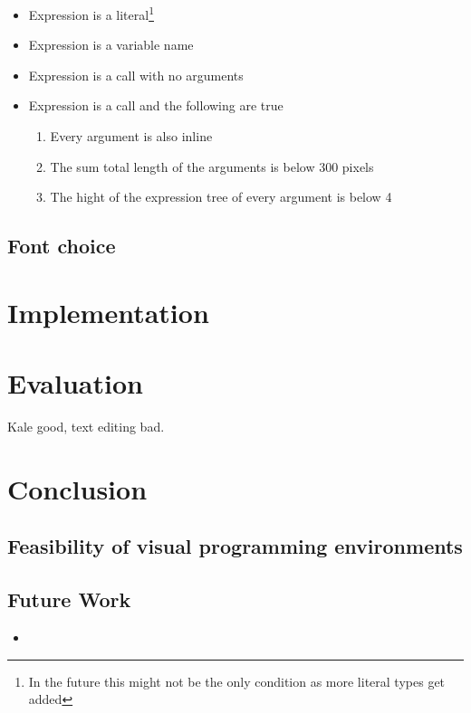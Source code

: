 \documentclass[11pt]{report}
\begin{document}
\begin{itemize}[noitemsep]
	\item Expression is a literal\footnote{In the future this might not be the
only condition as more literal types get added}
	\item Expression is a variable name
	\item Expression is a call with no arguments
	\item Expression is a call and the following are true
	\begin{enumerate}[noitemsep]
		\item Every argument is also inline
		\item The sum total length of the arguments is below 300 pixels
		\item The hight of the expression tree of every argument is below 4
	\end{enumerate}
\end{itemize}

\section{Font choice}

\chapter{Implementation}

\chapter{Evaluation}

Kale good, text editing bad.

\chapter{Conclusion}

\section{Feasibility of visual programming environments}

\section{Future Work}

\begin{itemize}
	\item 
\end{itemize}

\endgroup %
\clearpage
\renewcommand*{\bibfont}{\raggedright} %


\begin{appendices}
	
\end{appendices}
\end{document}
